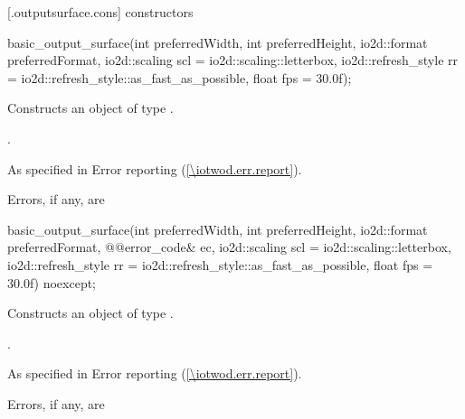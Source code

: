  [\iotwod.outputsurface.cons] { constructors}

%
\begin{itemdecl}
basic_output_surface(int preferredWidth, int preferredHeight,
  io2d::format preferredFormat,
  io2d::scaling scl = io2d::scaling::letterbox,
  io2d::refresh_style rr = io2d::refresh_style::as_fast_as_possible,
  float fps = 30.0f);
\end{itemdecl}
\begin{itemdescr}
\pnum
\effects Constructs an object of type .

\pnum
\postconditions {}.

\pnum
\throws As specified in Error reporting (\ref{\iotwod.err.report}).

\pnum
\errors Errors, if any, are 
\end{itemdescr}

%
\begin{itemdecl}
basic_output_surface(int preferredWidth, int preferredHeight,
  io2d::format preferredFormat,
  @\stdqualifier{}@error_code& ec, io2d::scaling scl = io2d::scaling::letterbox,
  io2d::refresh_style rr = io2d::refresh_style::as_fast_as_possible,
  float fps = 30.0f) noexcept;
\end{itemdecl}
\begin{itemdescr}
\pnum
\effects Constructs an object of type .

\pnum
\postconditions {}.

\pnum
\throws As specified in Error reporting (\ref{\iotwod.err.report}).

\pnum
\errors Errors, if any, are 
\end{itemdescr}

